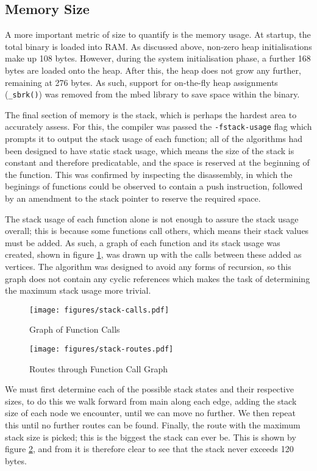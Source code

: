 \subsection{Memory Size}

A more important metric of size to quantify is the memory usage. At startup, the total binary is loaded into RAM. As discussed above, non-zero heap initialisations make up 108 bytes. However, during the system initialisation phase, a further 168 bytes are loaded onto the heap. After this, the heap does not grow any further, remaining at 276 bytes. As such, support for on-the-fly heap assignments (\verb|_sbrk()|) was removed from the mbed library to save space within the binary.

The final section of memory is the stack, which is perhaps the hardest area to accurately assess. For this, the compiler was passed the \verb|-fstack-usage| flag which prompts it to output the stack usage of each function; all of the algorithms had been designed to have static stack usage, which means the size of the stack is constant and therefore predicatable, and the space is reserved at the beginning of the function. This was confirmed by inspecting the disassembly, in which the beginings of functions could be observed to contain a push instruction, followed by an amendment to the stack pointer to reserve the required space.

The stack usage of each function alone is not enough to assure the stack usage overall; this is because some functions call others, which means their stack values must be added. As such, a graph of each function and its stack usage was created, shown in figure \ref{fig:stack-calls}, was drawn up with the calls between these added as vertices. The algorithm was designed to avoid any forms of recursion, so this graph does not contain any cyclic references which makes the task of determining the maximum stack usage more trivial.

\begin{figure}[!h]
    \centering
    \texttt{[image: figures/stack-calls.pdf]}
    \caption{Graph of Function Calls}
    \label{fig:stack-calls}
\end{figure}

\begin{figure}[!h]
    \centering
    \texttt{[image: figures/stack-routes.pdf]}
    \caption{Routes through Function Call Graph}
    \label{fig:stack-routes}
\end{figure}

We must first determine each of the possible stack states and their respective sizes, to do this we walk forward from main along each edge, adding the stack size of each node we encounter, until we can move no further. We then repeat this until no further routes can be found. Finally, the route with the maximum stack size is picked; this is the biggest the stack can ever be. This is shown by figure \ref{fig:stack-routes}, and from it is therefore clear to see that the stack never exceeds 120 bytes.


